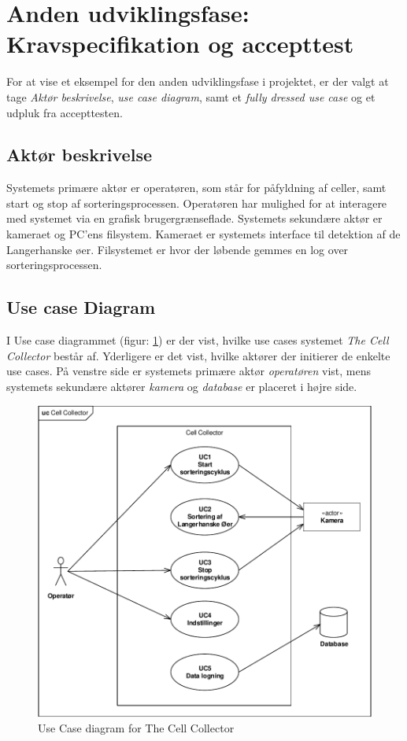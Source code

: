 \section{Anden udviklingsfase: Kravspecifikation og accepttest}
\label{subsec:krav}
For at vise et eksempel for den anden udviklingsfase i projektet, er der valgt at tage \textit{Aktør beskrivelse}, \textit{use case diagram}, samt et \textit{fully dressed use case} og et udpluk fra accepttesten.


\subsection{Aktør beskrivelse}
Systemets primære aktør er operatøren, som står for påfyldning af celler, samt start og stop af sorteringsprocessen. Operatøren har mulighed for at interagere med systemet via en grafisk brugergrænseflade. Systemets sekundære aktør er kameraet og PC’ens filsystem. Kameraet er systemets interface til detektion af de Langerhanske øer. Filsystemet er hvor der løbende gemmes en log over sorteringsprocessen.
\newpage
\subsection{Use case Diagram}
I Use case diagrammet (figur: \ref{fig:usecase}) er der vist, hvilke use cases systemet \textit{The Cell Collector} består af. Yderligere er det vist, hvilke aktører der initierer de enkelte use cases. På venstre side er systemets primære aktør \textit{operatøren} vist, mens systemets sekundære aktører \textit{kamera} og \textit{database} er placeret i højre side. 

\begin{figure}[H]
	\centering
	\includegraphics[width=1\textwidth]{billeder/UC_CellCollector.pdf}
	\caption{Use Case diagram for The Cell Collector}
	\label{fig:usecase}
\end{figure}

